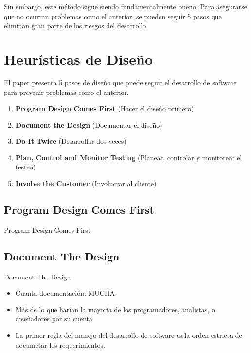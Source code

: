 \documentclass{beamer}
\begin{document}
\begin{frame}[fragile]

Sin embargo, este método sigue siendo fundamentalmente bueno. Para asegurarse que no ocurran problemas como el anterior, se pueden seguir 5 pasos que eliminan gran parte de los riesgos del desarrollo.

\end{frame}

\section{Heurísticas de Diseño}

\begin{frame}
El paper presenta 5 pasos de diseño que puede seguir el desarrollo de software para prevenir problemas como el anterior.

\begin{enumerate}
\item<2-> \textbf{Program Design Comes First} (Hacer el diseño primero)
\item<3-> \textbf{Document the Design} (Documentar el diseño)
\item<4-> \textbf{Do It Twice} (Desarrollar dos veces)
\item<5-> \textbf{Plan, Control and Monitor Testing} (Planear, controlar y monitorear el testeo)
\item<6-> \textbf{Involve the Customer} (Involucrar al cliente)
\end{enumerate}

\end{frame}

\subsection{Program Design Comes First}


\begin{frame}{Program Design Comes First}
\end{frame}

\subsection{Document The Design}
\begin{frame}{Document The Design}

\begin{itemize}
\item Cuanta documentación: MUCHA
\item Más de lo que harían la mayoría de los programadores, analistas, o diseñadores por su cuenta
\item La primer regla del manejo del desarrollo de  software es la orden estricta de documetar los requerimientos.
\end{itemize}

\end{frame}
\end{document}
